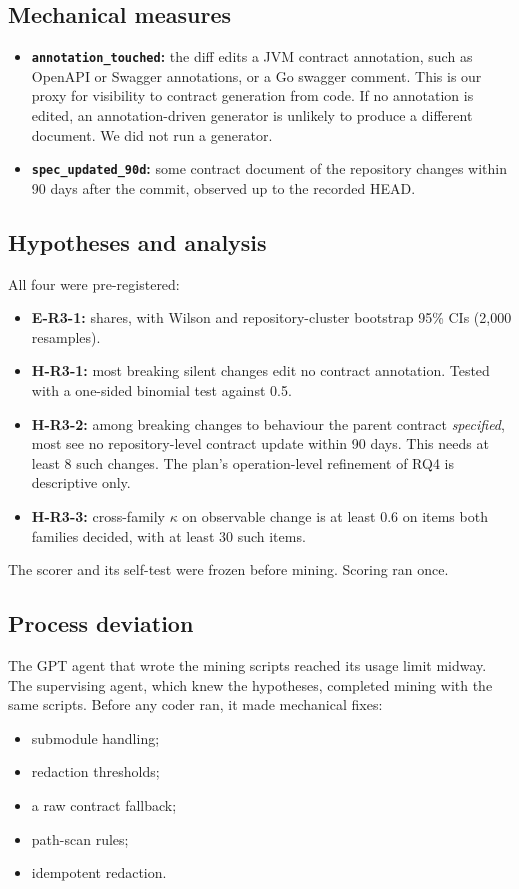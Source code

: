 \documentclass[conference]{IEEEtran}
\begin{document}
\subsection{Mechanical measures}
\begin{itemize}
\item \textbf{\texttt{annotation\_touched}:} the diff edits a JVM contract annotation, such as OpenAPI or Swagger annotations, or a Go swagger comment. This is our proxy for visibility to contract generation from code. If no annotation is edited, an annotation-driven generator is unlikely to produce a different document. We did not run a generator.
\item \textbf{\texttt{spec\_updated\_90d}:} some contract document of the repository changes within 90 days after the commit, observed up to the recorded HEAD.
\end{itemize}

\subsection{Hypotheses and analysis}
All four were pre-registered:
\begin{itemize}
\item \textbf{E-R3-1:} shares, with Wilson and repository-cluster bootstrap 95\% CIs (2,000 resamples).
\item \textbf{H-R3-1:} most breaking silent changes edit no contract annotation. Tested with a one-sided binomial test against 0.5.
\item \textbf{H-R3-2:} among breaking changes to behaviour the parent contract \emph{specified}, most see no repository-level contract update within 90 days. This needs at least 8 such changes. The plan's operation-level refinement of RQ4 is descriptive only.
\item \textbf{H-R3-3:} cross-family $\kappa$ on observable change is at least 0.6 on items both families decided, with at least 30 such items.
\end{itemize}

The scorer and its self-test were frozen before mining. Scoring ran once.

\subsection{Process deviation}
The GPT agent that wrote the mining scripts reached its usage limit midway. The supervising agent, which knew the hypotheses, completed mining with the same scripts. Before any coder ran, it made mechanical fixes:
\begin{itemize}
\item submodule handling;
\item redaction thresholds;
\item a raw contract fallback;
\item path-scan rules;
\item idempotent redaction.
\end{itemize}
\end{document}
